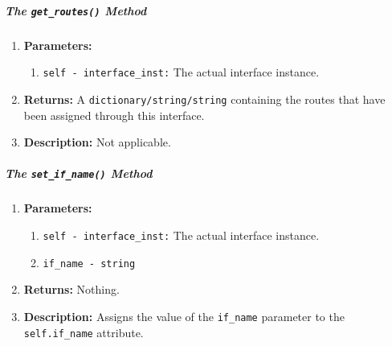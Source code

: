         \subparagraph{The \texttt{get\_routes()} Method}
            \begin{enumerate}
                \item \textbf{Parameters:}
                \begin{enumerate}
                    \item \texttt{self - interface\_inst:} The actual interface instance.
                \end{enumerate}
                \item \textbf{Returns:} A \texttt{dictionary/string/string} containing the routes that have been assigned through this interface.
                \item \textbf{Description:} Not applicable.
            \end{enumerate}

        \subparagraph{The \texttt{set\_if\_name()} Method}
            \begin{enumerate}
                \item \textbf{Parameters:}
                \begin{enumerate}
                    \item \texttt{self - interface\_inst:} The actual interface instance.
                    \item \texttt{if\_name - string}
                \end{enumerate}
                \item \textbf{Returns:} Nothing.
                \item \textbf{Description:} Assigns the value of the \texttt{if\_name} parameter to the \texttt{self.if\_name} attribute.
            \end{enumerate}

